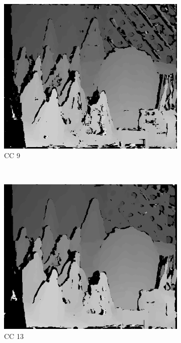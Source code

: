 \begin{figure}
  \begin{subfigure}[b]{0.23\textwidth}
    \centering
    \includegraphics[width=\textwidth]{images/stereo-pairs/cones_dual_crosschecked_9.png}
    \caption{CC 9}
  \end{subfigure}
  ~
  \begin{subfigure}[b]{0.23\textwidth}
    \centering
    \includegraphics[width=\textwidth]{images/stereo-pairs/cones_dual_crosschecked_13.png}
    \caption{CC 13}
  \end{subfigure}
  ~
  \begin{subfigure}[b]{0.23\textwidth}

\end{subfigure}
\end{figure}
